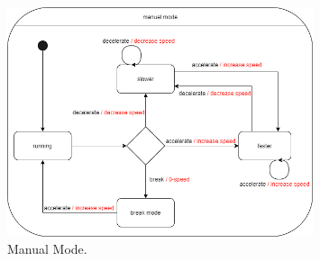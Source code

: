 \documentclass[12pt]{article}
\begin{document}
\begin{spacing}{1.5}
\begin{figure}[h!]
	\centering
		\includegraphics[width=0.8\textwidth]{./A2_Figures/4.2-Manual-mode.png}
		  \caption{Manual Mode.}
  \label{fig:manual-mode-fig}
\end{figure}

\end{spacing}
\end{document}
